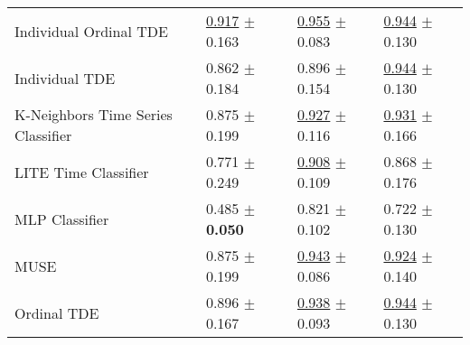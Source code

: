 \begin{tabular}{llll}
Individual Ordinal TDE & \underline{\textcolor[rgb]{0.0460251046,0.5000000000,0}{0.917}} $\pm$ \textcolor[rgb]{0.5577723962,0.4422276038,0}{0.163} & \underline{\textcolor[rgb]{0.0995260664,0.5000000000,0}{0.955}} $\pm$ \textcolor[rgb]{0.1853514393,0.5000000000,0}{0.083} & \underline{\textcolor[rgb]{0.1111111111,0.5000000000,0}{0.944}} $\pm$ \textcolor[rgb]{0.3121982484,0.5000000000,0}{0.130} \\
Individual TDE & \textcolor[rgb]{0.1656903766,0.5000000000,0}{0.862} $\pm$ \textcolor[rgb]{0.6604374232,0.3395625768,0}{0.184} & \textcolor[rgb]{0.4478672986,0.5000000000,0}{0.896} $\pm$ \textcolor[rgb]{1.0000000000,0.0000000000,0}{0.154} & \underline{\textcolor[rgb]{0.1111111111,0.5000000000,0}{0.944}} $\pm$ \textcolor[rgb]{0.3121982484,0.5000000000,0}{0.130} \\
K-Neighbors Time Series Classifier & \textcolor[rgb]{0.1380753138,0.5000000000,0}{0.875} $\pm$ \textcolor[rgb]{0.7390823473,0.2609176527,0}{0.199} & \underline{\textcolor[rgb]{0.2654028436,0.5000000000,0}{0.927}} $\pm$ \textcolor[rgb]{0.5603646102,0.4396353898,0}{0.116} & \underline{\textcolor[rgb]{0.1666666667,0.5000000000,0}{0.931}} $\pm$ \textcolor[rgb]{0.6500947039,0.3499052961,0}{0.166} \\
LITE Time Classifier & \textcolor[rgb]{0.3682008368,0.5000000000,0}{0.771} $\pm$ \textcolor[rgb]{0.9849172203,0.0150827797,0}{0.249} & \underline{\textcolor[rgb]{0.3791469194,0.5000000000,0}{0.908}} $\pm$ \textcolor[rgb]{0.4840348943,0.5000000000,0}{0.109} & \textcolor[rgb]{0.4166666667,0.5000000000,0}{0.868} $\pm$ \textcolor[rgb]{0.7404054892,0.2595945108,0}{0.176} \\
MLP Classifier & \textcolor[rgb]{1.0000000000,0.0000000000,0}{0.485} $\pm$ \textbf{\textcolor[rgb]{0.0000000000,0.5000000000,0}{0.050}} & \textcolor[rgb]{0.8957345972,0.1042654028,0}{0.821} $\pm$ \textcolor[rgb]{0.3997551421,0.5000000000,0}{0.102} & \textcolor[rgb]{1.0000000000,0.0000000000,0}{0.722} $\pm$ \textcolor[rgb]{0.3121982484,0.5000000000,0}{0.130} \\
MUSE & \textcolor[rgb]{0.1380753138,0.5000000000,0}{0.875} $\pm$ \textcolor[rgb]{0.7390823473,0.2609176527,0}{0.199} & \underline{\textcolor[rgb]{0.1706161137,0.5000000000,0}{0.943}} $\pm$ \textcolor[rgb]{0.2209016468,0.5000000000,0}{0.086} & \underline{\textcolor[rgb]{0.1944444444,0.5000000000,0}{0.924}} $\pm$ \textcolor[rgb]{0.4049258024,0.5000000000,0}{0.140} \\
Ordinal TDE & \textcolor[rgb]{0.0920502092,0.5000000000,0}{0.896} $\pm$ \textcolor[rgb]{0.5790995120,0.4209004880,0}{0.167} & \underline{\textcolor[rgb]{0.1990521327,0.5000000000,0}{0.938}} $\pm$ \textcolor[rgb]{0.2953042690,0.5000000000,0}{0.093} & \underline{\textcolor[rgb]{0.1111111111,0.5000000000,0}{0.944}} $\pm$ \textcolor[rgb]{0.3121982484,0.5000000000,0}{0.130} \\

\end{tabular}
